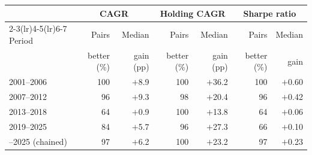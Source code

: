 \begin{tabular}{lrrrrrr}
\toprule
 & \multicolumn{2}{c}{CAGR} & \multicolumn{2}{c}{Holding CAGR} & \multicolumn{2}{c}{Sharpe ratio} \\
\cmidrule(lr){2-3}\cmidrule(lr){4-5}\cmidrule(lr){6-7}
Period & Pairs & Median & Pairs & Median & Pairs & Median \\
 & better (\%) & gain (pp) & better (\%) & gain (pp) & better (\%) & gain \\
\midrule
2001--2006 & 100 & $+$8.9 & 100 & $+$36.2 & 100 & $+$0.60 \\
2007--2012 & 96 & $+$9.3 & 98 & $+$20.4 & 96 & $+$0.42 \\
2013--2018 & 64 & $+$0.9 & 100 & $+$13.8 & 64 & $+$0.06 \\
2019--2025 & 84 & $+$5.7 & 96 & $+$27.3 & 66 & $+$0.10 \\
\addlinespace
2001--2025 (chained) & 97 & $+$6.2 & 100 & $+$23.2 & 97 & $+$0.23 \\
\bottomrule
\end{tabular}
